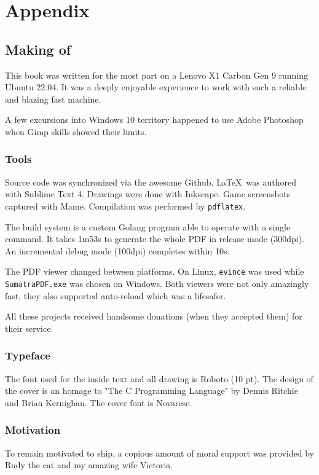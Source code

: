 \chapter{Appendix} 

\section{Making of}

This book was written for the most part on a Lenovo X1 Carbon Gen 9 running Ubuntu 22.04.
It was a deeply enjoyable experience to work with such a reliable and blazing fast machine. 



A few excursions into Windows 10 territory happened to use Adobe Photoshop when Gimp skills showed their limits. 

\subsection{Tools}

Source code was synchronized via the awesome Github. \LaTeX\ was authored with Sublime Text 4. Drawings were done with Inkscape. Game screenshots captured with Mame. Compilation was performed by \texttt{pdflatex}.

The build system is a custom Golang program able to operate with a single  command. It takes 1m53s to generate the whole PDF in release mode (300dpi). An incremental debug mode (100dpi) completes within 10s. 

The PDF viewer changed between platforms. On Linux, \texttt{evince} was used while \texttt{SumatraPDF.exe} was chosen on Windows. Both viewers were not only amazingly fast, they also supported auto-reload which was a lifesafer. 

All these projects received handsome donations (when they accepted them) for their service.

\subsection{Typeface}
The font used for the inside text and all drawing is Roboto (10 pt). The design of the cover is an homage to "The C Programming Language" by Dennis Ritchie and Brian Kernighan. The cover font is Novarese.

\subsection{Motivation}
To remain motivated to ship, a copious amount of moral support was provided by Rudy the cat and my amazing wife Victoria.
